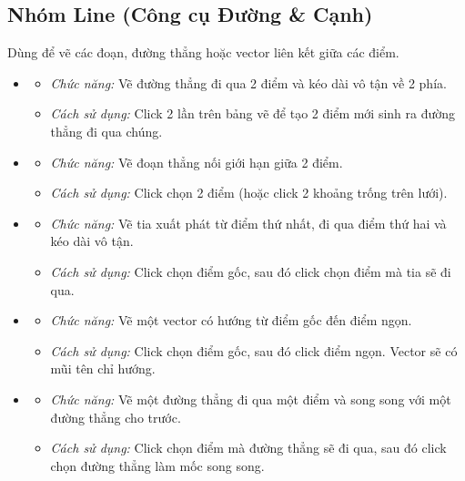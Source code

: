\documentclass[12pt,a4paper]{article}
\begin{document}
\subsection{Nhóm Line (Công cụ Đường \& Cạnh)}
Dùng để vẽ các đoạn, đường thẳng hoặc vector liên kết giữa các điểm.
\begin{itemize}[label=\textcolor{primary}{\faGripLines}]
    \item {}
    \begin{itemize}
        \item \textit{Chức năng:} Vẽ đường thẳng đi qua 2 điểm và kéo dài vô tận về 2 phía.
        \item \textit{Cách sử dụng:} Click 2 lần trên bảng vẽ để tạo 2 điểm mới sinh ra đường thẳng đi qua chúng.
    \end{itemize}

    \item {}
    \begin{itemize}
        \item \textit{Chức năng:} Vẽ đoạn thẳng nối giới hạn giữa 2 điểm.
        \item \textit{Cách sử dụng:} Click chọn 2 điểm (hoặc click 2 khoảng trống trên lưới).
    \end{itemize}
    
    \item {}
    \begin{itemize}
        \item \textit{Chức năng:} Vẽ tia xuất phát từ điểm thứ nhất, đi qua điểm thứ hai và kéo dài vô tận.
        \item \textit{Cách sử dụng:} Click chọn điểm gốc, sau đó click chọn điểm mà tia sẽ đi qua.
    \end{itemize}

    \item {}
    \begin{itemize}
        \item \textit{Chức năng:} Vẽ một vector có hướng từ điểm gốc đến điểm ngọn.
        \item \textit{Cách sử dụng:} Click chọn điểm gốc, sau đó click điểm ngọn. Vector sẽ có mũi tên chỉ hướng.
    \end{itemize}

    \item {}
    \begin{itemize}
        \item \textit{Chức năng:} Vẽ một đường thẳng đi qua một điểm và song song với một đường thẳng cho trước.
        \item \textit{Cách sử dụng:} Click chọn điểm mà đường thẳng sẽ đi qua, sau đó click chọn đường thẳng làm mốc song song.
    \end{itemize}


\end{itemize}
\end{document}
